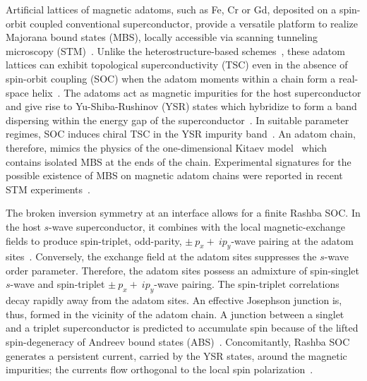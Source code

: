 \documentclass[aps,prl,reprint,nobibnotes]{revtex4-1}
\begin{document}
Artificial lattices of magnetic adatoms, such as Fe, Cr or Gd, deposited on a spin-orbit coupled conventional superconductor, provide a versatile platform to realize Majorana bound states (MBS), locally accessible via scanning tunneling microscopy (STM)~\cite{PhysRevB.88.020407,Li2016,PhysRevLett.114.236803,Nadj-Perge602,Feldman2017,Pawlak2016,PhysRevLett.115.197204,Ruby_NanoLetters,2016arXiv160706353M}. Unlike the heterostructure-based schemes~\cite{PhysRevLett.100.096407,PhysRevLett.105.077001,Mourik1003,0295-5075-108-6-60001}, these adatom lattices can exhibit topological superconductivity (TSC) even in the absence of spin-orbit coupling (SOC) when the adatom moments within a chain form a real-space helix~\cite{PhysRevB.90.085124,PhysRevB.91.064505,PhysRevB.94.144509}. The adatoms act as magnetic impurities for the host superconductor and give rise to Yu-Shiba-Rushinov (YSR) states which hybridize to form a band dispersing within the energy gap of the superconductor~\cite{YU_acta1965,shiba_PTP1968,rushinov_JETP1969,1367-2630-17-2-023051}. In suitable parameter regimes, SOC induces chiral TSC in the YSR impurity band~\cite{PhysRevB.93.014517,PhysRevB.88.155420,PhysRevLett.114.106801,PhysRevB.90.235433,PhysRevB.93.094508,PhysRevB.94.100501,0953-8984-28-49-495703,PhysRevB.94.060501, PhysRevB.93.024507,PhysRevB.91.064502,PhysRevB.90.180503,PhysRevB.90.060507,PhysRevB.89.180505,PhysRevB.89.115109,Hui2015,PhysRevB.94.144509}. An adatom chain, therefore, mimics the physics of the one-dimensional Kitaev model~\cite{1063-7869-44-10S-S29} which contains isolated MBS at the ends of the chain. Experimental signatures for the possible existence of MBS on magnetic adatom chains were reported in recent STM experiments~\cite{Nadj-Perge602,Feldman2017,Pawlak2016,PhysRevLett.115.197204,Ruby_NanoLetters}. 

The broken inversion symmetry at an interface allows for a finite Rashba SOC. In the host $s$-wave superconductor, it combines with the local magnetic-exchange fields to produce spin-triplet, odd-parity, $\pm~p_x+~ip_y$-wave pairing at the adatom sites~\cite{2017arXiv170505378R}. Conversely, the exchange field at the adatom sites suppresses the $s$-wave order parameter. Therefore, the adatom sites possess an admixture of spin-singlet $s$-wave and spin-triplet $\pm~p_x+~ip_y$-wave pairing. The spin-triplet correlations decay rapidly away from the adatom sites.  An effective Josephson junction is, thus, formed in the vicinity of the adatom chain. A junction between a singlet and a triplet superconductor is predicted to accumulate spin because of the lifted spin-degeneracy of Andreev bound states (ABS)~\cite{PhysRevLett.101.187003}. Concomitantly, Rashba SOC generates a persistent current, carried by the YSR states, around the magnetic impurities; the currents flow orthogonal to the local spin polarization~\cite{PhysRevLett.115.116602}.
\end{document}
